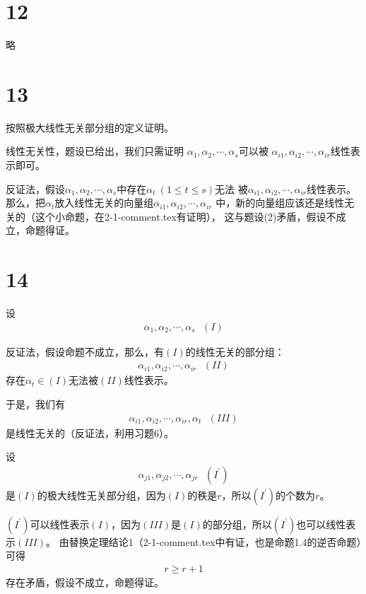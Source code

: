 \documentclass{article}
\begin{document}
\section*{12}

略

\section*{13}

按照极大线性无关部分组的定义证明。

线性无关性，题设已给出，我们只需证明
$\alpha_1, \alpha_2, \cdots, \alpha_s$可以被
$\alpha_{i1}, \alpha_{i2}, \cdots, \alpha_{ir}$线性表示即可。

反证法，假设$\alpha_1, \alpha_2, \cdots, \alpha_s$中存在$\alpha_t \ (1 \leq t \leq s)$无法
被$\alpha_{i1}, \alpha_{i2}, \cdots, \alpha_{ir}$线性表示。
那么，把$\alpha_t$放入线性无关的向量组$\alpha_{i1}, \alpha_{i2}, \cdots, \alpha_{ir}$
中，新的向量组应该还是线性无关的（这个小命题，在2-1-comment.tex有证明），
这与题设(2)矛盾，假设不成立，命题得证。

\section*{14}

设
\begin{align*}
  \alpha_1, \alpha_2, \cdots, \alpha_s \ \ \ (I)
\end{align*}

反证法，假设命题不成立，那么，有$(I)$的线性无关的部分组：
\begin{align*}
  \alpha_{i1}, \alpha_{i2}, \cdots, \alpha_{ir} \ \ \ (II)
\end{align*}
存在$\alpha_t \in (I)$无法被$(II)$线性表示。

于是，我们有
\begin{align*}
  \alpha_{i1}, \alpha_{i2}, \cdots, \alpha_{ir}, \alpha_t  \ \ \ (III)
\end{align*}
是线性无关的（反证法，利用习题6）。

设
\begin{align*}
  \alpha_{j1}, \alpha_{j2}, \cdots, \alpha_{jr} \ \ \ (I^\prime)
\end{align*}
是$(I)$的极大线性无关部分组，因为$(I)$的秩是$r$，所以$(I^\prime)$的个数为$r$。

$(I^\prime)$可以线性表示$(I)$，因为$(III)$是$(I)$的部分组，所以$(I^\prime)$也可以线性表示$(III)$。
由替换定理结论1（2-1-comment.tex中有证，也是命题1.4的逆否命题）可得
\begin{align*}
  r \geq r + 1
\end{align*}
存在矛盾，假设不成立，命题得证。
\end{document}
